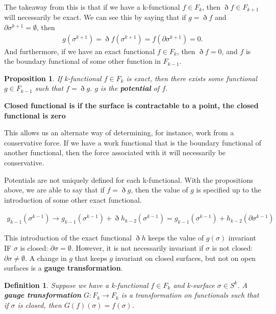 \documentclass{book}
\newtheorem{defn}[equation]{Definition}
\newtheorem{prop}[equation]{Proposition}
\begin{document}
The takeaway from this is that if we have a k-functional $f \in F_k$, then $\eth f \in F_{k+1}$ will necessarily be exact. We can see this by saying that if $g = \eth f$ and $\partial\sigma^{k+1} = \emptyset$, then \begin{gather} g(\sigma^{k+1}) = \eth f(\sigma^{k+1}) = f(\partial\sigma^{k+1}) = 0.\end{gather} And furthermore, if we have an exact functional $f \in F_k$, then $\eth f = 0$, and $f$ is the boundary functional of some other function in $F_{k-1}$. 
\begin{prop}
	If k-functional $f \in F_k$ is exact, then there exists some functional $g \in F_{k-1}$ such that $f = \eth g$. $g$ is the \textbf{potential} of $f$.  
\end{prop}

\textbf{Closed functional is if the surface is contractable to a point, the closed functional is zero}


This allows us an alternate way of determining, for instance, work from a conservative force. If we have a work functional that is the boundary functional of another functional, then the force associated with it will necessarily be conservative.



Potentials are not uniquely defined for each k-functional. With the propositions above, we are able to say that if $f = \eth g$, then the value of $g$ is specified up to the introduction of some other exact functional. 

\begin{gather} 
g_{k-1}(\sigma^{k-1}) \to g_{k-1}(\sigma^{k-1}) + \eth h_{k-2}(\sigma^{k-1}) = g_{k-1}(\sigma^{k-1}) + h_{k-2}(\partial\sigma^{k-1})
\end{gather}



This introduction of the exact functional $\eth h$ keeps the value of $g(\sigma)$ invariant IF $\sigma$ is closed: $\partial\sigma = \emptyset$. However, it is not necessarily invariant if $\sigma$ is not closed: $\partial\sigma \neq \emptyset$. A change in $g$ that keeps $g$ invariant on closed surfaces, but not on open surfaces is a \textbf{gauge transformation}. 

\begin{defn}
	Suppose we have a k-functional $f \in F_k$ and k-surface $\sigma \in S^k$. A \textbf{gauge transformation} $G: F_k \to F_k$ is a transformation on functionals such that if $\sigma$ is closed, then $G(f)(\sigma) = f(\sigma)$.
\end{defn}
\end{document}

